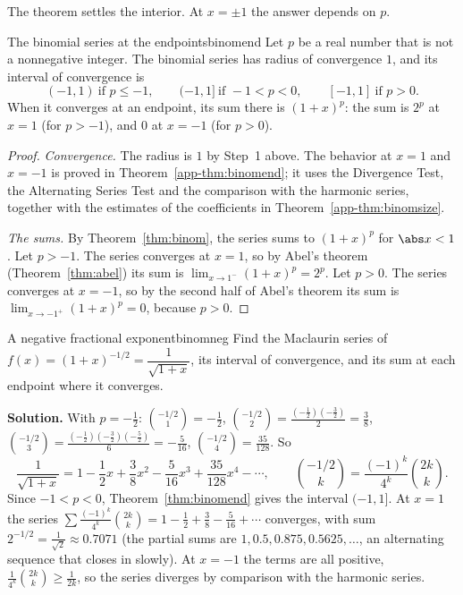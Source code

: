 \documentclass[11pt]{article}
\begin{document}
The theorem settles the interior. At $x=\pm1$ the answer depends on $p$.

\begin{thm}{The binomial series at the endpoints}{binomend}
Let $p$ be a real number that is not a nonnegative integer. The binomial series has radius of convergence $1$, and its interval of convergence is
\[
(-1,1)\ \text{if }p\le-1,\qquad(-1,1]\ \text{if }-1<p<0,\qquad[-1,1]\ \text{if }p>0 .
\]
When it converges at an endpoint, its sum there is $(1+x)^p$: the sum is $2^p$ at $x=1$ (for $p>-1$), and $0$ at $x=-1$ (for $p>0$).
\end{thm}
\begin{proof}
\emph{Convergence.} The radius is $1$ by Step~1 above. The behavior at $x=1$ and $x=-1$ is proved in Theorem~\ref{app-thm:binomend}; it uses the Divergence Test, the Alternating Series Test and the comparison with the harmonic series, together with the estimates of the coefficients in Theorem~\ref{app-thm:binomsize}.

\emph{The sums.} By Theorem~\ref{thm:binom}, the series sums to $(1+x)^p$ for $\abs x<1$. Let $p>-1$. The series converges at $x=1$, so by Abel's theorem (Theorem~\ref{thm:abel}) its sum is $\lim_{x\to1^-}(1+x)^p=2^p$. Let $p>0$. The series converges at $x=-1$, so by the second half of Abel's theorem its sum is $\lim_{x\to-1^+}(1+x)^p=0$, because $p>0$.
\end{proof}

\begin{exmp}{A negative fractional exponent}{binomneg}
Find the Maclaurin series of $f(x)=(1+x)^{-1/2}=\dfrac1{\sqrt{1+x}}$, its interval of convergence, and its sum at each endpoint where it converges.

\textbf{Solution.} With $p=-\frac12$: $\binom{-1/2}1=-\frac12$, $\binom{-1/2}2=\frac{(-\frac12)(-\frac32)}2=\frac38$, $\binom{-1/2}3=\frac{(-\frac12)(-\frac32)(-\frac52)}6=-\frac5{16}$, $\binom{-1/2}4=\frac{35}{128}$. So
\[
\frac1{\sqrt{1+x}}=1-\frac12x+\frac38x^2-\frac5{16}x^3+\frac{35}{128}x^4-\cdots,\qquad\binom{-1/2}k=\frac{(-1)^k}{4^k}\binom{2k}k .
\]
Since $-1<p<0$, Theorem~\ref{thm:binomend} gives the interval $(-1,1]$. At $x=1$ the series $\sum\frac{(-1)^k}{4^k}\binom{2k}k=1-\frac12+\frac38-\frac5{16}+\cdots$ converges, with sum $2^{-1/2}=\frac1{\sqrt2}\approx0.7071$ (the partial sums are $1,0.5,0.875,0.5625,\dots$, an alternating sequence that closes in slowly). At $x=-1$ the terms are all positive, $\frac1{4^k}\binom{2k}k\ge\frac1{2k}$, so the series diverges by comparison with the harmonic series.
\end{exmp}
\end{document}
